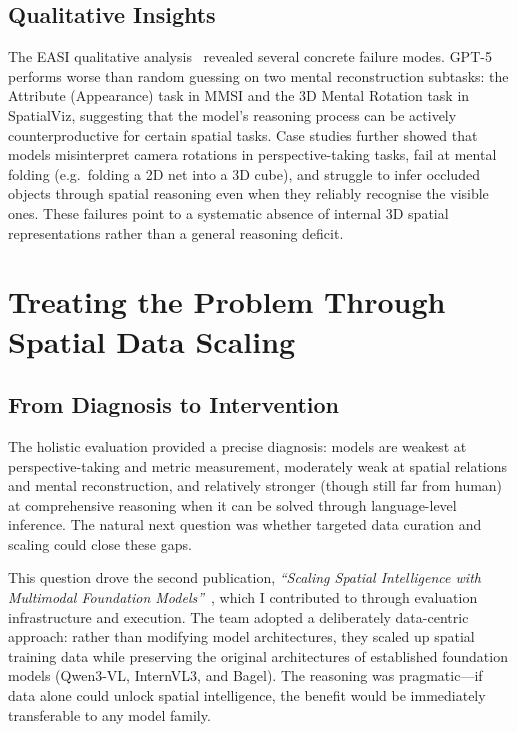 \documentclass[
hf,
]{confart}
\begin{document}
\subsection{Qualitative Insights}

The EASI qualitative analysis~\cite{cai2025holisticevaluationmultimodalllms} revealed several concrete failure modes. GPT-5 performs worse than random guessing on two mental reconstruction subtasks: the Attribute (Appearance) task in MMSI and the 3D Mental Rotation task in SpatialViz, suggesting that the model's reasoning process can be actively counterproductive for certain spatial tasks. Case studies further showed that models misinterpret camera rotations in perspective-taking tasks, fail at mental folding (e.g.\ folding a 2D net into a 3D cube), and struggle to infer occluded objects through spatial reasoning even when they reliably recognise the visible ones. These failures point to a systematic absence of internal 3D spatial representations rather than a general reasoning deficit.


\section{Treating the Problem Through Spatial Data Scaling}
\label{sec:treatment}

\subsection{From Diagnosis to Intervention}

The holistic evaluation provided a precise diagnosis: models are weakest at perspective-taking and metric measurement, moderately weak at spatial relations and mental reconstruction, and relatively stronger (though still far from human) at comprehensive reasoning when it can be solved through language-level inference. The natural next question was whether targeted data curation and scaling could close these gaps.

This question drove the second publication, \textit{``Scaling Spatial Intelligence with Multimodal Foundation Models''}~\cite{cai2025scalingspatialintelligencemultimodal}, which I contributed to through evaluation infrastructure and execution. The team adopted a deliberately data-centric approach: rather than modifying model architectures, they scaled up spatial training data while preserving the original architectures of established foundation models (Qwen3-VL, InternVL3, and Bagel). The reasoning was pragmatic---if data alone could unlock spatial intelligence, the benefit would be immediately transferable to any model family.
\end{document}
